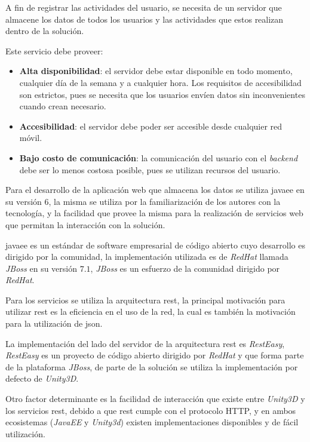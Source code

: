
A fin de registrar las actividades del usuario, se necesita de un servidor que
almacene los datos de todos los usuarios y las actividades que estos realizan
dentro de la solución.

Este servicio debe proveer:

\begin{itemize}
    \item \textbf{Alta disponibilidad}: el servidor debe estar disponible en
        todo momento, cualquier día de la semana y a cualquier hora. Los
        requisitos de accesibilidad son estrictos, pues se necesita que los
        usuarios envíen datos sin inconvenientes cuando crean necesario.
    \item \textbf{Accesibilidad}: el servidor debe poder ser accesible desde
        cualquier red móvil.
    \item \textbf{Bajo costo de comunicación}: la comunicación del usuario con
        el \textit{backend} debe ser lo menos costosa posible, pues se utilizan
        recursos del usuario.
\end{itemize}

Para el desarrollo de la aplicación web que almacena los datos se utiliza
\Gls{javaee} en su versión $6$, la misma se utiliza por la familiarización de
los autores con la tecnología, y la facilidad que provee la misma para la
realización de servicios web que permitan la interacción con la solución.

\Gls{javaee} es un estándar de software empresarial de código abierto cuyo
desarrollo es dirigido por la comunidad\cite{javaee}, la implementación
utilizada es de \textit{RedHat} llamada \textit{JBoss} en su versión $7.1$,
\textit{JBoss} es un esfuerzo de la comunidad dirigido por \textit{RedHat}. 

Para los servicios se utiliza la arquitectura \Gls{rest}, la principal
motivación para utilizar \Gls{rest} es la eficiencia en el uso de la
red\cite{pautasso2008restful}, la cual es también la motivación para la
utilización de \Gls{json}. 

La implementación del lado del servidor de la arquitectura \Gls{rest} es
\textit{RestEasy}, \textit{RestEasy} es un proyecto de código abierto dirigido
por \textit{RedHat} y que forma parte de la plataforma \textit{JBoss}, de parte
de la solución se utiliza la implementación por defecto de \textit{Unity3D}.

Otro factor determinante es la facilidad de interacción que existe entre
\textit{Unity3D} y los servicios \Gls{rest}, debido a que \Gls{rest} cumple con
el protocolo HTTP, y en ambos ecosistemas (\textit{JavaEE} y \textit{Unity3d})
existen implementaciones disponibles y de fácil utilización.

